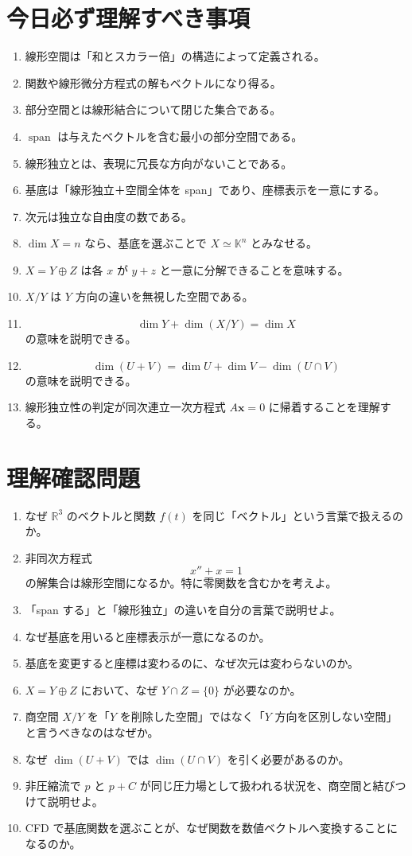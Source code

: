 \documentclass[a4paper,11pt]{ltjsarticle}
\newcommand{\R}{\mathbb{R}}
\newcommand{\K}{\mathbb{K}}
\newcommand{\Span}{\operatorname{span}}
\begin{document}
\section{今日必ず理解すべき事項}

\begin{enumerate}
  \item 線形空間は「和とスカラー倍」の構造によって定義される。
  \item 関数や線形微分方程式の解もベクトルになり得る。
  \item 部分空間とは線形結合について閉じた集合である。
  \item $\Span$ は与えたベクトルを含む最小の部分空間である。
  \item 線形独立とは、表現に冗長な方向がないことである。
  \item 基底は「線形独立＋空間全体を span」であり、座標表示を一意にする。
  \item 次元は独立な自由度の数である。
  \item $\dim X=n$ なら、基底を選ぶことで $X\simeq\K^n$ とみなせる。
  \item $X=Y\oplus Z$ は各 $x$ が $y+z$ と一意に分解できることを意味する。
  \item $X/Y$ は $Y$ 方向の違いを無視した空間である。
  \item
  \[
  \dim Y+\dim(X/Y)=\dim X
  \]
  の意味を説明できる。
  \item
  \[
  \dim(U+V)=\dim U+\dim V-\dim(U\cap V)
  \]
  の意味を説明できる。
  \item 線形独立性の判定が同次連立一次方程式 $A\bm{x}=0$ に帰着することを理解する。
\end{enumerate}

\section{理解確認問題}

\begin{enumerate}
  \item なぜ $\R^3$ のベクトルと関数 $f(t)$ を同じ「ベクトル」という言葉で扱えるのか。
  \item 非同次方程式
  \[
  x''+x=1
  \]
  の解集合は線形空間になるか。特に零関数を含むかを考えよ。
  \item 「span する」と「線形独立」の違いを自分の言葉で説明せよ。
  \item なぜ基底を用いると座標表示が一意になるのか。
  \item 基底を変更すると座標は変わるのに、なぜ次元は変わらないのか。
  \item $X=Y\oplus Z$ において、なぜ $Y\cap Z=\{0\}$ が必要なのか。
  \item 商空間 $X/Y$ を「$Y$ を削除した空間」ではなく「$Y$ 方向を区別しない空間」と言うべきなのはなぜか。
  \item なぜ $\dim(U+V)$ では $\dim(U\cap V)$ を引く必要があるのか。
  \item 非圧縮流で $p$ と $p+C$ が同じ圧力場として扱われる状況を、商空間と結びつけて説明せよ。
  \item CFD で基底関数を選ぶことが、なぜ関数を数値ベクトルへ変換することになるのか。
\end{enumerate}
\end{document}
